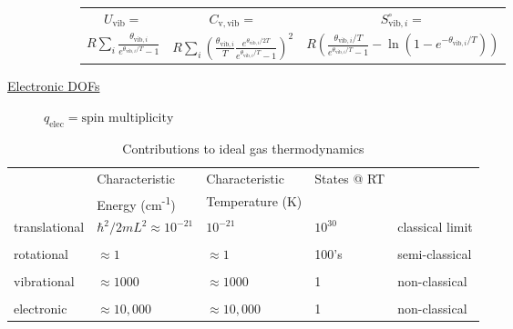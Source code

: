 \documentclass[11pt]{article}
\begin{document}
\begin{table}
\begin{center}
\begin{description}
\begin{description}
\begin{tabular}{ccc}
$ U_\mathrm{vib}= $ & $  C_\mathrm{v,vib} = $ & $S^\circ_{\mathrm{vib},i}=$ \\
$\displaystyle
R\sum_i\frac{\theta_{\mathrm{vib},i}}{e^{\theta_{\mathrm{vib},i}/T}-1}$ &
$\displaystyle R \sum_i \left (
  \frac{\theta_{\mathrm{vib},i}}{T}\frac{e^{\theta_{\mathrm{vib},i}/2T}}{e^{\theta_{\mathrm{vib},i}/T}-1}
\right )^2 $ & $\displaystyle R \left ( \frac{\theta_{\mathrm{vib},i}/T}{e^{\theta_{\mathrm{vib},i}/T}-1}
-\ln(1-e^{-\theta_{\mathrm{vib},i}/T})\right ) $ \\
\end{tabular}

\end{description}
\item[\underline{Electronic DOFs}] {}
$q_\mathrm{elec} = \text{spin multiplicity}$


\end{description}
\end{center}
\end{table}

\begin{table}[htbp]
\caption{Contributions to ideal gas thermodynamics}
\centering
\begin{tabular}{lllll}
\hline
 & Characteristic & Characteristic & States @ RT & \\
 & Energy (cm\textsuperscript{-1}) & Temperature (K) &  & \\
\hline
translational & \(\hbar^2/2 m L^2 \approx 10^{-21}\) & \(10^{-21}\) & \(10^{30}\) & classical limit\\
 &  &  &  & \\
rotational & \(\approx 1\) & \(\approx 1\) & 100's & semi-classical\\
 &  &  &  & \\
vibrational & \(\approx 1000\) & \(\approx 1000\) & 1 & non-classical\\
 &  &  &  & \\
electronic & \(\approx 10,000\) & \(\approx 10,000\) & 1 & non-classical\\
\hline
\end{tabular}
\end{table}
\end{document}
